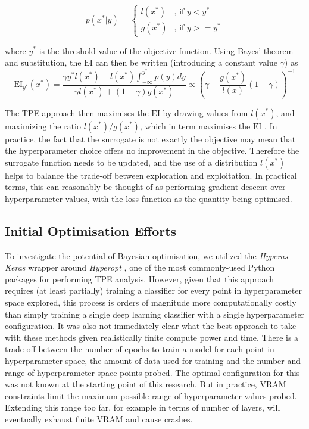 \begin{equation}
    p(x^*|y) = \begin{cases} \textit{l}(x^*) & \mbox{, if }  y <y^* \\ \textit{g}(x^*) & \mbox{, if } y>=y^* \end{cases}
\end{equation}

where $y^*$ is the threshold value of the objective function. Using Bayes' theorem and substitution, the $\textrm{EI}$ can then be written (introducing a constant value $\gamma$) as 
\begin{equation}
    \textrm{EI}_{y^*}(x^*)=\frac{\gamma y^* \textit{l}(x^*)-\textit{l}(x^*)\int_{-\infty}^{y^*}p(y)dy}{\gamma \textit{l}(x^*)+(1-\gamma) \textit{g}(x^*)} \propto \left( \gamma +\frac{\textit{g}(x^*)}{\textit{l}(x)} (1-\gamma)\right)^{-1}
\end{equation}


The TPE approach then maximises the $\textrm{EI}$ by drawing values from $\textit{l}(x^*)$, and maximizing the ratio $\textit{l}(x^*)/\textit{g}(x^*)$, which in term maximises the $\textrm{EI}$ \cite{tdshyper}. In practice, the fact that the surrogate is not exactly the objective may mean that the hyperparameter choice offers no improvement in the objective. Therefore the surrogate function needs to be updated, and the use of a distribution $\textit{l}(x^*)$ helps to balance the trade-off between exploration and exploitation. In practical terms, this can reasonably be thought of as performing gradient descent over hyperparameter values, with the loss function as the quantity being optimised.

\subsection{Initial Optimisation Efforts}

To investigate the potential of Bayesian optimisation, we utilized the \textit{Hyperas} \cite{hyperas} \textit{Keras} wrapper around \textit{Hyperopt} \cite{hyperopt}, one of the most commonly-used Python packages for performing TPE analysis. However, given that this approach requires (at least partially) training a classifier for every point in hyperparameter space explored, this process is orders of magnitude more computationally costly than simply training a single deep learning classifier with a single hyperparameter configuration. It was also not immediately clear what the best approach to take with these methods given realistically finite compute power and time. There is a trade-off between the number of epochs to train a model for each point in hyperparameter space, the amount of data used for training and the number and range of hyperparameter space points probed. The optimal configuration for this was not known at the starting point of this research. But in practice, VRAM constraints limit the maximum possible range of hyperparameter values probed. Extending this range too far, for example in terms of number of layers, will eventually exhaust finite VRAM and cause crashes.

